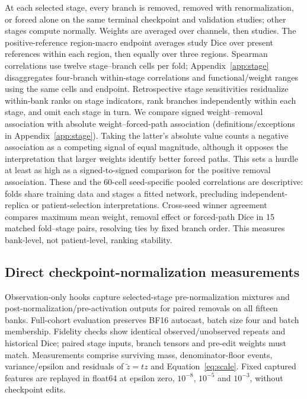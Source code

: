 \documentclass[mathematics,article,submit,pdftex,moreauthors]{Definitions/mdpi}
\begin{document}
At each selected stage, every branch is removed, removed with renormalization,
or forced alone on the same terminal checkpoint and validation studies;
other stages compute normally. Weights are averaged over channels, then
studies. The positive-reference region-macro endpoint averages study Dice
over present references within each region, then equally over three regions.
Spearman correlations use twelve stage--branch cells per fold;
Appendix~\ref{app:stage} disaggregates four-branch within-stage correlations
and functional/weight ranges using the same cells and endpoint.
Retrospective stage sensitivities residualize within-bank ranks on stage
indicators, rank branches independently within each stage, and omit each
stage in turn. We compare signed weight--removal association with absolute
weight--forced-path association (definitions/exceptions in
Appendix~\ref{app:stage}). Taking the latter's absolute value counts a negative
association as a competing signal of equal magnitude, although it opposes
the interpretation that larger weights identify better forced paths. This
sets a hurdle at least as high as a signed-to-signed comparison for the
positive removal association. These and the 60-cell seed-specific pooled
correlations are descriptive: folds share training data and stages a fitted
network, precluding independent-replica or patient-selection interpretations.
Cross-seed winner agreement compares maximum mean weight, removal effect or
forced-path Dice in 15 matched fold--stage pairs, resolving ties by fixed
branch order. This measures bank-level, not patient-level, ranking stability.

\subsection{Direct checkpoint-normalization measurements}\label{subsec:checkpointnorm}
Observation-only hooks capture selected-stage pre-normalization mixtures and
post-normalization/pre-activation outputs for paired removals on all fifteen
banks. Full-cohort evaluation preserves BF16 autocast, batch size four and
batch membership. Fidelity checks show identical observed/unobserved repeats
and historical Dice; paired stage inputs, branch tensors and pre-edit weights
must match. Measurements comprise surviving mass, denominator-floor events,
variance/epsilon and residuals of $\widetilde z=tz$ and
Equation~\eqref{eq:scale}. Fixed captured features are replayed in float64
at epsilon zero, $10^{-8}$, $10^{-5}$ and $10^{-3}$, without checkpoint edits.
\end{document}
